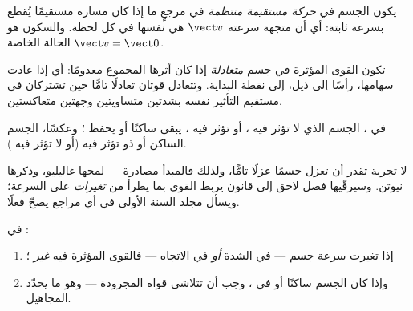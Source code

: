 \begin{definition}\label{def:g10:inertia:uniform}
يكون الجسم في \emph{حركة مستقيمة منتظمة} في مرجعٍ ما إذا كان مساره مستقيمًا يُقطع
بسرعة ثابتة: أي أن متجهة سرعته $\vect v$ هي نفسها في كل
لحظة. والسكون هو الحالة الخاصة $\vect v = \vect 0$.
\end{definition}

\begin{definition}\label{def:g10:inertia:compensate}
تكون القوى المؤثرة في جسم \emph{متعادلة}
إذا كان أثرها المجموع معدومًا: أي إذا عادت سهامها، رأسًا إلى ذيل، إلى
نقطة البداية. وتتعادل قوتان تعادلًا تامًّا حين تشتركان في مستقيم
التأثير نفسه بشدتين متساويتين وجهتين متعاكستين.
\end{definition}

\begin{theorem}\label{thm:g10:inertia:principle}
في ، الجسم الذي لا تؤثر فيه ، أو تؤثر فيه ، يبقى ساكنًا أو يحفظ ؛
وعكسًا، الجسم الساكن أو ذو  تؤثر فيه
 (أو لا تؤثر فيه ).
\end{theorem}
\admitted

\begin{remark}
لا تجربة تقدر أن تعزل جسمًا عزلًا تامًّا، ولذلك فالمبدأ مصادرة
--- لمحها غاليليو، وذكرها نيوتن. وسيرقّيها فصل لاحق إلى
قانون يربط القوى بما يطرأ من \emph{تغيرات} على السرعة؛ ويسأل مجلد السنة الأولى
في أي مراجع يصحّ فعلًا.
\end{remark}

\begin{proposition}\label{prop:g10:inertia:converse}
في :
\begin{enumerate}
  \item إذا تغيرت سرعة جسم --- في الشدة \emph{أو} في
        الاتجاه --- فالقوى المؤثرة فيه \emph{غير} ؛
  \item وإذا كان الجسم ساكنًا أو في ، وجب أن
        تتلاشى قواه المجرودة --- وهو ما يحدّد المجاهيل.
\end{enumerate}
\end{proposition}

